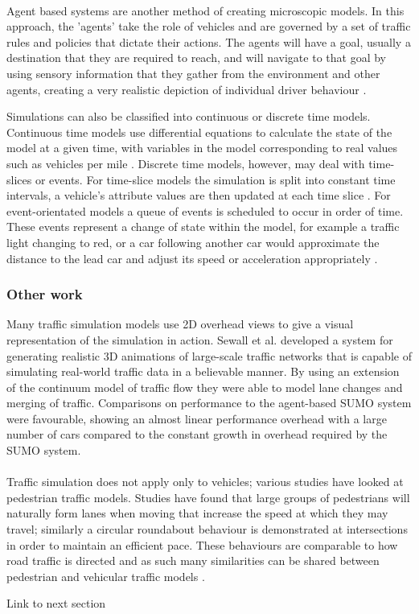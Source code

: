 \paragraph{}
Agent based systems are another method of creating microscopic models. In this approach, the 'agents' take the role of vehicles and are governed by a set of traffic rules and policies that dictate their actions. The agents will have a goal, usually a destination that they are required to reach, and will navigate to that goal by using sensory information that they gather from the environment and other agents, creating a very realistic depiction of individual driver behaviour \cite{948773,4621183}.

Simulations can also be classified into continuous or discrete time models.
Continuous time models use differential equations to calculate the state of the model at a given time, with variables in the model corresponding to real values such as vehicles per mile \cite{Lighthill1955Kinetic}.
Discrete time models, however, may deal with time-slices or events. For time-slice models the simulation is split into constant time intervals, a vehicle's attribute values are then updated at each time slice \cite{Schulze:1997:UTS:268437.268764}. For event-orientated models a queue of events is scheduled to occur in order of time. These events represent a change of state within the model, for example a traffic light changing to red, or a car following another car would approximate the distance to the lead car and adjust its speed or acceleration appropriately \cite{Schulze:1997:UTS:268437.268764,algers1997review}.

\subsubsection*{Other work}
Many traffic simulation models use 2D overhead views to give a visual representation of the simulation in action. Sewall et al. \cite{sewall2010continuum} developed a system for generating realistic 3D animations of large-scale traffic networks that is capable of simulating real-world traffic data in a believable manner. By using an extension of the continuum model of traffic flow they were able to model lane changes and merging of traffic. Comparisons on performance to the agent-based SUMO \cite{SUMO} system were favourable, showing an almost linear performance overhead with a large number of cars compared to the constant growth in overhead required by the SUMO system.

\paragraph{}
Traffic simulation does not apply only to vehicles; various studies have looked at pedestrian traffic models. Studies have found that large groups of pedestrians will naturally form lanes when moving that increase the speed at which they may travel; similarly a circular roundabout behaviour is demonstrated at intersections in order to maintain an efficient pace. These behaviours are comparable to how road traffic is directed and as such many similarities can be shared between pedestrian and vehicular traffic models \cite{helbing2001self,lovaas1994modeling,helbing2001traffic}.

Link to next section

